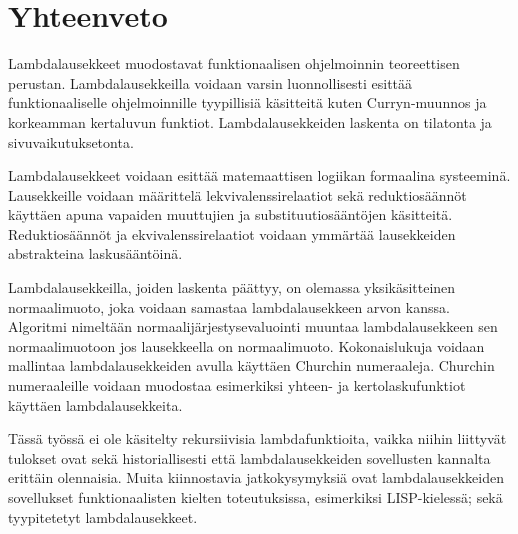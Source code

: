 \section{Yhteenveto}

Lambdalausekkeet muodostavat funktionaalisen ohjelmoinnin teoreettisen perustan. Lambdalausekkeilla voidaan varsin luonnollisesti esittää funktionaaliselle ohjelmoinnille tyypillisiä käsitteitä kuten Curryn-muunnos ja korkeamman kertaluvun funktiot. Lambdalausekkeiden laskenta on tilatonta ja sivuvaikutuksetonta. 

\par

Lambdalausekkeet voidaan esittää matemaattisen logiikan formaalina systeeminä. Lausekkeille voidaan määrittelä lekvivalenssirelaatiot sekä reduktiosäännöt käyttäen apuna vapaiden muuttujien ja substituutiosääntöjen käsitteitä. Reduktiosäännöt ja ekvivalenssirelaatiot voidaan ymmärtää lausekkeiden abstrakteina laskusääntöinä.

\par

Lambdalausekkeilla, joiden laskenta päättyy, on olemassa yksikäsitteinen normaalimuoto, joka voidaan samastaa lambdalausekkeen arvon kanssa. Algoritmi nimeltään normaalijärjestysevaluointi muuntaa lambdalausekkeen sen normaalimuotoon jos lausekkeella on normaalimuoto. Kokonaislukuja voidaan mallintaa lambdalausekkeiden avulla käyttäen Churchin numeraaleja. Churchin numeraaleille voidaan muodostaa esimerkiksi yhteen- ja kertolaskufunktiot käyttäen lambdalausekkeita. 

\par 

Tässä työssä ei ole käsitelty rekursiivisia lambdafunktioita, vaikka niihin liittyvät tulokset ovat sekä historiallisesti että lambdalausekkeiden sovellusten kannalta erittäin olennaisia. Muita kiinnostavia jatkokysymyksiä ovat lambdalausekkeiden sovellukset funktionaalisten kielten toteutuksissa, esimerkiksi LISP-kielessä; sekä tyypitetetyt lambdalausekkeet.